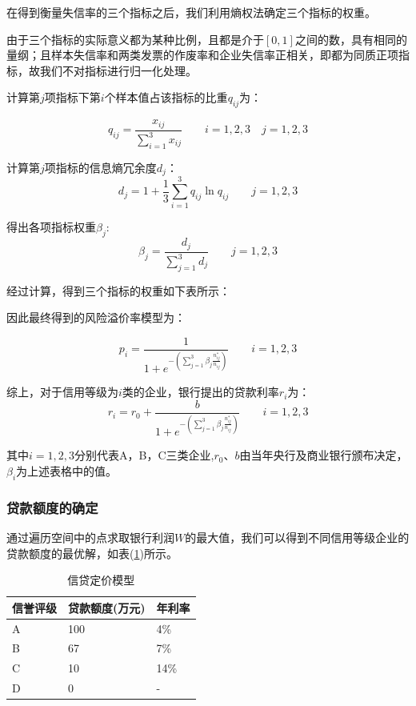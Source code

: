 \documentclass[withoutpreface,bwprint]{cumcmthesis} %
\begin{document}
在得到衡量失信率的三个指标之后，我们利用熵权法确定三个指标的权重。

由于三个指标的实际意义都为某种比例，且都是介于$[0,1]$之间的数，具有相同的量纲；且样本失信率和两类发票的作废率和企业失信率正相关，即都为同质正项指标，故我们不对指标进行归一化处理。

计算第$j$项指标下第$i$个样本值占该指标的比重$q_{ij}$为：

\begin{equation}
q_{ij}=\frac{x_{ij}}{\sum_{i=1}^{3}x_{ij}}\qquad i=1,2,3 \quad j=1,2,3
\end{equation}

计算第$j$项指标的信息熵冗余度$d_j$：
\begin{equation}
d_j=1+\frac{1}{3}\sum_{i=1}^{3}q_{ij}\ln q_{ij} \qquad j=1,2,3
\end{equation}

得出各项指标权重$\beta_j$:
\begin{equation}
\beta_j=\frac{d_j}{\sum_{j=1}^{3}d_j}\qquad j=1,2,3
\end{equation}

经过计算，得到三个指标的权重如下表所示：

因此最终得到的风险溢价率模型为：

\begin{equation}
p_i=\frac{1}{1+e^{-(\sum_{j=1}^3\beta_j\frac{n^*_{ij}}{n_{ij}})}} \qquad i=1,2,3
\end{equation}

综上，对于信用等级为$i$类的企业，银行提出的贷款利率$r_i$为：
\begin{equation}
r_i=r_0+\frac{b}{1+e^{-(\sum_{j=1}^3\beta_j\frac{n^*_{ij}}{n_{ij}})}} \qquad i=1,2,3
\end{equation}

其中$i=1,2,3$分别代表A，B，C三类企业,$r_0$、$b$由当年央行及商业银行颁布决定，$\beta_i$为上述表格中的值。


\subsubsection{贷款额度的确定}

通过遍历空间中的点求取银行利润$W$的最大值，我们可以得到不同信用等级企业的贷款额度的最优解，如表(\ref{tb:res})所示。

\begin{table}[h]
	\caption{信贷定价模型}
	\label{tb:res}
	\centering
	\begin{tabular}{lll}
		\hline
		信誉评级 &  贷款额度(万元)  &  年利率 \\
		\hline
		A & 100 & 4\%  \\
		B & 67 & 7\%  \\
		C & 10 & 14\%  \\
		D & 0 & -  \\
		\hline
	\end{tabular}
\end{table}
\end{document}
